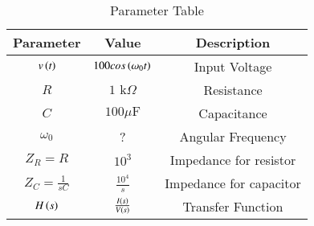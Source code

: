 \begin{table}[ht]
	  \centering
	    \begin{tabular}{|c|c|c|}
		        \hline
			   \textbf{ Parameter} & \textbf{Value} & \textbf{Description} \\
			       \hline
			           $v\left(t\right)$ & $100cos\left(\omega_0 t\right)$ & Input Voltage \\
				       \hline
				           $R$ & $1\text{ k}\Omega$ & Resistance \\
					       \hline
					           $C$ & $100\mu\text{F}$ & Capacitance \\
						       \hline
						           $\omega_0$ & ? & Angular Frequency  \\
							       \hline
							           $Z_R = R$ & $10^3$ & Impedance for resistor  \\
								       \hline
								           $Z_C = \frac{1}{sC}$ & $\frac{10^{4}}{s}$ & Impedance for capacitor  \\
									       \hline
									           $H\left(s\right)$ & $\frac{I\left(s\right)}{V\left(s\right)}$ & Transfer Function \\
										       \hline
										         \end{tabular}
											   \vspace{2mm}
											     \caption{Parameter Table}
											       \label{BM_23_32}
\end{table}
